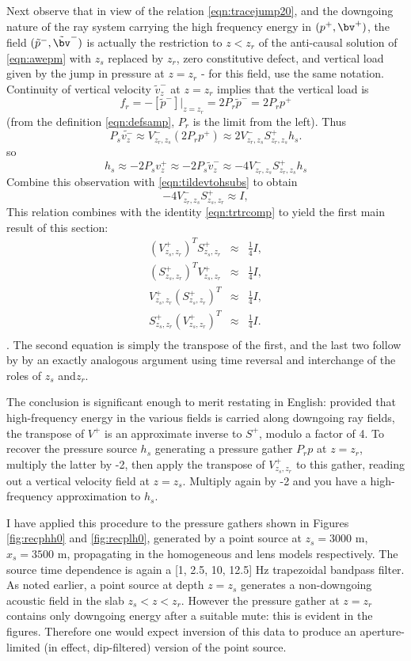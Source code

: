 Next observe that in view of the relation \ref{eqn:tracejump20}, and
the downgoing nature of the ray system carrying the high frequency
energy in $(p^+,\bv^+)$, the field $(\tilde{p}^-,\tilde{\bv}^-)$ is
actually the restriction to $z<z_r$ of the anti-causal solution of \ref{eqn:awepm}
with $z_s$ replaced by $z_r$, zero constitutive defect, and vertical
load given by the jump in pressure at $z=z_r$ - for this field, use
the same notation. Continuity of vertical
velocity $\tilde{v}^-_z$ at $z=z_r$ implies that the vertical load is
\[
  f_r = -[\tilde{p}^-]|_{z=z_r} = 2 P_r \tilde{p}^- = 2 P_r p^+
\]
(from the definition \ref{eqn:defsamp}, $P_r$ is the limit from the
left). Thus
\[
  P_s \tilde{v^-_z} \approx V^-_{z_r,z_s}(2 P_rp^+) \approx
  2V^-_{z_r,z_s}S^+_{z_r,z_s}h_s.
\]
so
\[
  h_s \approx -2 P_s v^+_z \approx -2 P_s \tilde{v}^-_z \approx
  -4V^-_{z_r,z_s}S^+_{z_r,z_s}h_s
\]
Combine this observation with \ref{eqn:tildevtohsubs} to obtain
\[
 -4  V^-_{z_r,z_s} S^+_{z_s,z_r}  \approx  I,
\]
This relation combines with the identity \ref{eqn:trtrcomp} to
yield the first main result of this section:
\begin{eqnarray}
  \label{eqn:approxinv}
  (V^+_{z_s,z_r})^T S^+_{z_s,z_r} & \approx & \frac{1}{4}I, \nonumber\\
  (S^+_{z_s,z_r})^T V^+_{z_s,z_r} & \approx & \frac{1}{4}I, \nonumber\\
  V^+_{z_s,z_r} (S^+_{z_s,z_r})^T & \approx & \frac{1}{4}I, \nonumber\\
  S^+_{z_s,z_r} (V^+_{z_s,z_r})^T & \approx & \frac{1}{4}I.\\
\end{eqnarray}.
The second equation is simply the transpose of the first, and the
last two follow by by an exactly analogous argument using time
reversal and interchange of the roles of $z_s$ and$z_r$.

The conclusion is significant enough to merit restating in English:
provided that high-frequency energy in the various fields is carried
along downgoing ray fields, the transpose of $V^+$ is an approximate
inverse to $S^+$, modulo a factor of 4. To recover the pressure source
$h_s$ generating a pressure gather $P_rp$ at $z=z_r$, multiply the
latter by -2, then apply the transpose of $V^+_{z_s,z_r}$ to this
gather, reading out a vertical velocity field at $z=z_s$. Multiply
again by -2 and you have a high-frequency approximation to $h_s$.

I have applied this procedure to the pressure gathers shown in Figures
\ref{fig:recphh0} and \ref{fig:recplh0}, generated by a point source
at $z_s=3000$ m, $x_s=3500$ m, propagating in the homogeneous and lens
models respectively. The source time dependence is again a
[1, 2.5, 10, 12.5] Hz trapezoidal bandpass filter. As noted earlier,
a point source at depth $z=z_s$ generates a non-downgoing acoustic
field in the slab $z_s < z < z_r$. However the pressure gather at
$z=z_r$ contains only downgoing energy after a suitable mute: this is
evident in the figures. Therefore one would expect inversion of this
data to produce an aperture-limited (in effect, dip-filtered) version
of the point source.

